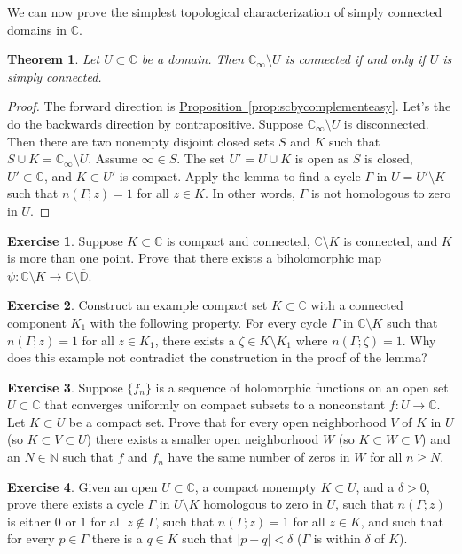 \documentclass[12pt,openany]{book}
\newcommand{\sabs}[1]{\lvert {#1} \rvert}
\newcommand{\C}{{\mathbb{C}}}
\newcommand{\N}{{\mathbb{N}}}
\newcommand{\D}{{\mathbb{D}}}
\theoremstyle{plain}
\newtheorem{thm}{Theorem}[section]
\theoremstyle{remark}
\theoremstyle{definition}
\newenvironment{exbox}{%
    \def\FrameCommand{\vrule width 1pt \relax\hspace{10pt}}%
    \MakeFramed{\advance\hsize-\width\FrameRestore}%
}{%
    \endMakeFramed
}
\theoremstyle{exercise}
\newtheorem{exercise}{Exercise}[section]
\theoremstyle{example}
\newcommand{\propref}[1]{\hyperref[#1]{Proposition~\ref*{#1}}}
\begin{document}
We can now prove the simplest
topological characterization of simply connected domains in $\C$.

\begin{thm} \label{cor:scbycomplementhard}
Let $U \subset \C$ be a domain.  Then
$\C_\infty \setminus U$ is connected if and only if $U$ is simply connected.
\end{thm}

\begin{proof}
The forward direction is \propref{prop:scbycomplementeasy}.  Let's the do
the backwards direction by contrapositive.  Suppose $\C_\infty
\setminus U$ is disconnected.  Then there are two nonempty disjoint closed
sets $S$ and $K$ such that $S \cup K = \C_\infty \setminus U$. 
Assume $\infty \in S$.
The set $U' = U \cup K$ is open as $S$ is closed, $U' \subset \C$,
and $K \subset U'$ is compact.  Apply the lemma to find a cycle
$\Gamma$ in $U = U' \setminus K$ such that $n(\Gamma;z) = 1$ for all $z \in
K$.  In other words, $\Gamma$ is not homologous to zero in $U$.
\end{proof}

\begin{exbox}
\begin{exercise}
Suppose $K \subset \C$ is compact and connected, $\C \setminus K$ is
connected, and $K$ is more than one point.
Prove that there exists a biholomorphic
map $\psi \colon \C \setminus K \to \C \setminus \overline{\D}$.
\end{exercise}

\begin{exercise}
Construct an example compact set $K \subset \C$ with a connected component $K_1$
with the following property.
For every cycle $\Gamma$ in $\C \setminus K$ such that $n(\Gamma;z)=1$ for
all $z \in K_1$,
there exists a $\zeta \in K \setminus K_1$ where $n(\Gamma;\zeta)=1$.
Why does this example not contradict the construction in the proof of the lemma?
\end{exercise}

\begin{exercise}
Suppose $\{ f_n \}$ is a sequence of holomorphic functions on an open set
$U \subset \C$ that converges uniformly on compact subsets to
a nonconstant
$f \colon U \to \C$.  Let $K \subset U$ be a compact set.  Prove that
for every open neighborhood $V$ of $K$ in $U$ (so $K \subset V \subset U$) there exists
a smaller open neighborhood $W$ (so $K \subset W \subset V$) and an $N \in \N$
such that $f$ and $f_n$ have the same number of zeros in $W$ for all
$n \geq N$.
\end{exercise}

\begin{exercise}
Given an open $U \subset \C$, a compact nonempty $K \subset U$, and a $\delta > 0$,
prove there
exists a cycle $\Gamma$ in $U \setminus K$ homologous to zero in $U$,
such that $n(\Gamma;z)$ is either $0$ or $1$ for all $z \notin \Gamma$,
such that
$n(\Gamma;z) = 1$ for all $z \in K$, 
and such that for every $p \in \Gamma$ there is a $q \in K$ such that
$\sabs{p-q} < \delta$ ($\Gamma$ is within $\delta$ of $K$).
\end{exercise}
\end{exbox}
\end{document}

